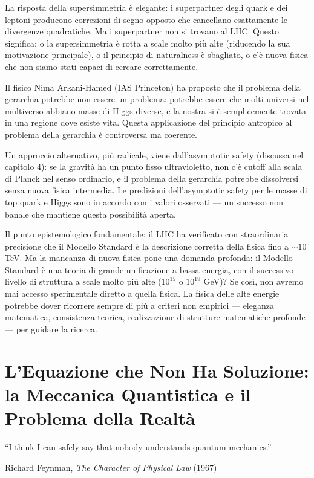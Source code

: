 \documentclass[11.5pt,a4paper,openany]{book}
\theoremstyle{remark}
\begin{document}
La risposta della supersimmetria è elegante: i superpartner degli quark e dei leptoni producono correzioni di segno opposto che cancellano esattamente le divergenze quadratiche. Ma i superpartner non si trovano al LHC. Questo significa: o la supersimmetria è rotta a scale molto più alte (riducendo la sua motivazione principale), o il principio di naturalness è sbagliato, o c'è nuova fisica che non siamo stati capaci di cercare correttamente.

Il fisico Nima Arkani-Hamed (IAS Princeton) ha proposto che il problema della gerarchia potrebbe non essere un problema: potrebbe essere che molti universi nel multiverso abbiano masse di Higgs diverse, e la nostra si è semplicemente trovata in una regione dove esiste vita. Questa applicazione del principio antropico al problema della gerarchia è controversa ma coerente.

Un approccio alternativo, più radicale, viene dall'asymptotic safety (discussa nel capitolo 4): se la gravità ha un punto fisso ultravioletto, non c'è cutoff alla scala di Planck nel senso ordinario, e il problema della gerarchia potrebbe dissolversi senza nuova fisica intermedia. Le predizioni dell'asymptotic safety per le masse di top quark e Higgs sono in accordo con i valori osservati --- un successo non banale che mantiene questa possibilità aperta.

Il punto epistemologico fondamentale: il LHC ha verificato con straordinaria precisione che il Modello Standard è la descrizione corretta della fisica fino a $\sim 10$ TeV. Ma la mancanza di nuova fisica pone una domanda profonda: il Modello Standard è una teoria di grande unificazione a bassa energia, con il successivo livello di struttura a scale molto più alte ($10^{15}$ o $10^{19}$ GeV)? Se così, non avremo mai accesso sperimentale diretto a quella fisica. La física delle alte energie potrebbe dover ricorrere sempre di più a criteri non empirici --- eleganza matematica, consistenza teorica, realizzazione di strutture matematiche profonde --- per guidare la ricerca.

\chapter{L'Equazione che Non Ha Soluzione: la Meccanica Quantistica e il Problema della Realtà}

\epigraph{``I think I can safely say that nobody understands quantum mechanics.''}{Richard Feynman, \textit{The Character of Physical Law} (1967)}
\end{document}
